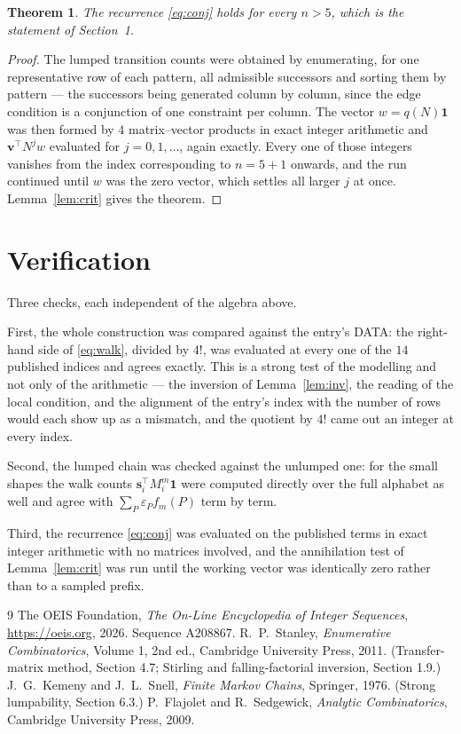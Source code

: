 \documentclass[11pt,a4paper]{article}
\theoremstyle{plain}
\newtheorem{theorem}{Theorem}
\theoremstyle{definition}
\begin{document}
\begin{theorem}
The recurrence \eqref{eq:conj} holds for every $n>5$, which is the statement of
Section~1.
\end{theorem}

\begin{proof}
The lumped transition counts were obtained by enumerating, for one representative row of
each pattern, all admissible successors and sorting them by pattern --- the successors being
generated column by column, since the edge condition is a conjunction of one constraint per
column. The vector $w=q(N)\mathbf{1}$ was then formed by $4$ matrix--vector products
in exact integer arithmetic and $\mathbf{v}^{\!\top}N^{j}w$ evaluated for
$j=0,1,\dots$, again exactly. Every one of those integers vanishes from the index
corresponding to $n=5+1$ onwards, and the run continued until $w$ was the zero vector,
which settles all larger $j$ at once. Lemma~\ref{lem:crit} gives the theorem.
\end{proof}

\section{Verification}

Three checks, each independent of the algebra above.

First, the whole construction was compared against the entry's DATA: the right-hand side of
\eqref{eq:walk}, divided by $4!$, was evaluated at every one of the $14$
published indices and agrees exactly. This is a strong test of the modelling and not only of
the arithmetic --- the inversion of Lemma~\ref{lem:inv}, the reading of the local
condition, and the alignment of the entry's index with the number of rows would each
show up as a mismatch, and the quotient by $4!$ came out an integer at every index.

Second, the lumped chain was checked against the unlumped one: for the small shapes the walk
counts $\mathbf{s}_i^{\!\top}M_i^{m}\mathbf{1}$ were computed directly over the full
alphabet as well and agree with $\sum_P\varepsilon_Pf_m(P)$ term by term.

Third, the recurrence \eqref{eq:conj} was evaluated on the published terms in exact integer
arithmetic with no matrices involved, and the annihilation test of Lemma~\ref{lem:crit} was
run until the working vector was identically zero rather than to a sampled prefix.

\begin{thebibliography}{9}
 The OEIS Foundation, \emph{The On-Line Encyclopedia of Integer
Sequences}, \url{https://oeis.org}, 2026. Sequence A208867.
 R.~P.~Stanley, \emph{Enumerative Combinatorics}, Volume 1, 2nd ed.,
Cambridge University Press, 2011. (Transfer-matrix method, Section 4.7; Stirling and
falling-factorial inversion, Section 1.9.)
 J.~G.~Kemeny and J.~L.~Snell, \emph{Finite Markov Chains}, Springer,
1976. (Strong lumpability, Section 6.3.)
 P.~Flajolet and R.~Sedgewick, \emph{Analytic Combinatorics}, Cambridge
University Press, 2009.
\end{thebibliography}
\end{document}
